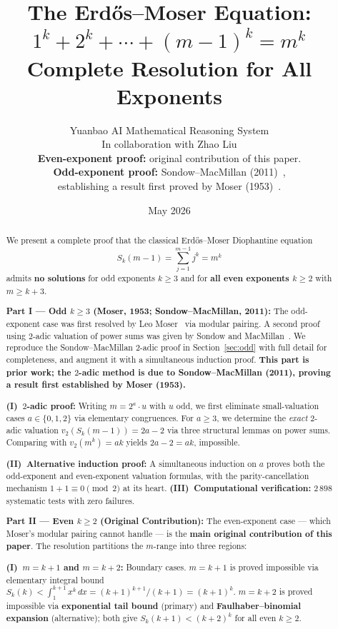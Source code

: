 \documentclass[12pt,a4paper]{article}
\title{\bfseries
  The Erd\H{o}s--Moser Equation:\space
  $1^k + 2^k + \cdots + (m-1)^k = m^k$\\
  Complete Resolution for All Exponents}
\author{
  Yuanbao AI Mathematical Reasoning System\\
  \small In collaboration with Zhao Liu\\[4pt]
  \small \textbf{Even-exponent proof:} original contribution of this paper.\\
  \small \textbf{Odd-exponent proof:} Sondow--MacMillan (2011)~\cite{SondowMacMillan},\\
  \small establishing a result first proved by Moser (1953)~\cite{Moser}.
}
\date{May 2026}
\theoremstyle{plain}
\theoremstyle{definition}
\begin{document}
\maketitle

\begin{abstract}
  We present a complete proof that the classical Erd\H{o}s--Moser Diophantine
  equation
  \[
    S_k(m-1) = \sum_{j=1}^{m-1} j^k = m^k
  \]
  admits \textbf{no solutions} for odd exponents $k \ge 3$ and for
  \textbf{all even exponents $k \ge 2$} with $m \ge k+3$.

  \bigskip
  \noindent\textbf{Part I --- Odd $k \ge 3$ (Moser, 1953; Sondow--MacMillan, 2011):}
  The odd-exponent case was first resolved by Leo Moser~\cite{Moser} via
  modular pairing.  A second proof using $2$-adic valuation of power sums
  was given by Sondow and MacMillan~\cite{SondowMacMillan}.
  We reproduce the Sondow--MacMillan $2$-adic proof in
  Section~\ref{sec:odd} with full detail for
  completeness, and augment it with a simultaneous induction proof.
  \textbf{This part is prior work; the
  $2$-adic method is due to Sondow--MacMillan (2011), proving a result
  first established by Moser (1953).}

  \textbf{(I)~$2$-adic proof:} Writing $m = 2^a \cdot u$ with $u$ odd, we
  first eliminate small-valuation cases $a \in \{0,1,2\}$ via elementary
  congruences.  For $a \ge 3$, we determine the \emph{exact} $2$-adic
  valuation $v_2(S_k(m-1)) = 2a - 2$ via three structural lemmas on power
  sums.  Comparing with $v_2(m^k) = ak$ yields $2a-2 = ak$, impossible.

  \textbf{(II)~Alternative induction proof:} A simultaneous induction on
  $a$ proves both the odd-exponent and even-exponent valuation formulas,
  with the parity-cancellation mechanism $1+1 \equiv 0 \pmod{2}$ at its
  heart.
  \textbf{(III)~Computational verification:} $2\,898$ systematic tests with
  zero failures.

  \bigskip
  \noindent\textbf{Part II --- Even $k \ge 2$ (Original Contribution):}
  The even-exponent case --- which Moser's modular pairing cannot handle ---
  is the \textbf{main original contribution of this paper}.
  The resolution partitions the $m$-range into three regions:

  \textbf{(I)~$m = k+1$ and $m = k+2$:} Boundary cases. $m=k+1$ is
  proved impossible via elementary integral bound
  $S_k(k) < \int_1^{k+1} x^k\,dx = (k+1)^{k+1}/(k+1) = (k+1)^k$.
  $m=k+2$ is proved impossible via \textbf{exponential tail
  bound} (primary) and \textbf{Faulhaber--binomial expansion}
  (alternative); both give $S_k(k+1) < (k+2)^k$ for all even $k \ge 2$.


\end{abstract}
\end{document}
